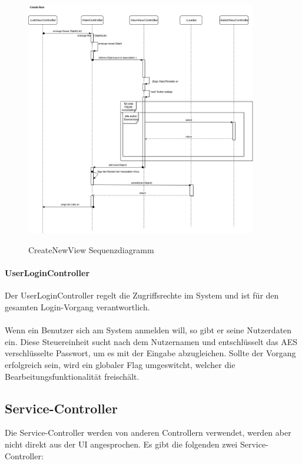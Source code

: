 \begin{figure}[H]
	\caption{CreateNewView Sequenzdiagramm}
	\includegraphics[width=0.9\textwidth]{content/pictures/CreateNewView}
	\label{pic:createNewViewSeq_diag}
\end{figure}

\paragraph{UserLoginController}
Der UserLoginController regelt die Zugriffsrechte im System und ist für den gesamten Login-Vorgang verantwortlich.\\
\\
Wenn ein Benutzer sich am System anmelden will, so gibt er seine Nutzerdaten ein. Diese Steuereinheit sucht nach dem Nutzernamen und
entschlüsselt das AES verschlüsselte Passwort, um es mit der Eingabe abzugleichen. Sollte der Vorgang erfolgreich sein, wird ein
globaler Flag umgeswitcht, welcher die Bearbeitungsfunktionalität freischält.

\subsection{Service-Controller}

Die Service-Controller werden von anderen Controllern verwendet, werden aber nicht direkt aus der UI angesprochen.
Es gibt die folgenden zwei Service-Controller:\\

